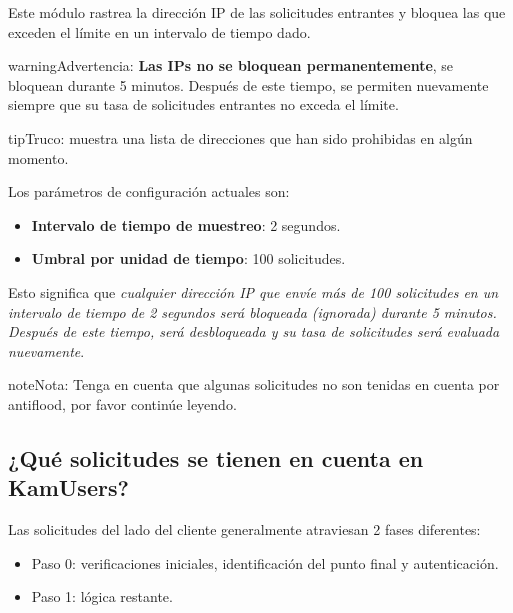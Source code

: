 \documentclass[letterpaper,10pt,spanish]{sphinxmanual}
\begin{document}
Este módulo rastrea la dirección IP de las solicitudes entrantes y bloquea las que exceden el límite en un intervalo de tiempo dado.

\begin{notice}{warning}{Advertencia:}
\textbf{Las IPs no se bloquean permanentemente}, se bloquean durante 5 minutos. Después de este tiempo, se permiten nuevamente siempre que su tasa de solicitudes entrantes no exceda el límite.
\end{notice}

\begin{notice}{tip}{Truco:}
{\hyperref[administration_portal/platform/antiflood_banned_ips:antiflood\string-banned\string-ips]{}} muestra una lista de direcciones que han sido prohibidas en algún momento.
\end{notice}

Los parámetros de configuración actuales son:
\begin{itemize}
\item {} 
\textbf{Intervalo de tiempo de muestreo}: 2 segundos.

\item {} 
\textbf{Umbral por unidad de tiempo}: 100 solicitudes.

\end{itemize}

Esto significa que \emph{cualquier dirección IP que envíe más de 100 solicitudes en un intervalo de tiempo de 2 segundos será bloqueada (ignorada) durante 5 minutos. Después de este tiempo, será desbloqueada y su tasa de solicitudes será evaluada nuevamente}.

\begin{notice}{note}{Nota:}
Tenga en cuenta que algunas solicitudes no son tenidas en cuenta por antiflood, por favor continúe leyendo.
\end{notice}


\subsection{¿Qué solicitudes se tienen en cuenta en KamUsers?}
\label{security_and_maintenance/security/antiflooding:which-requests-are-taken-into-account-in-kamusers}
Las solicitudes del lado del cliente generalmente atraviesan 2 fases diferentes:
\begin{itemize}
\item {} 
Paso 0: verificaciones iniciales, identificación del punto final y autenticación.

\item {} 
Paso 1: lógica restante.

\end{itemize}
\end{document}
